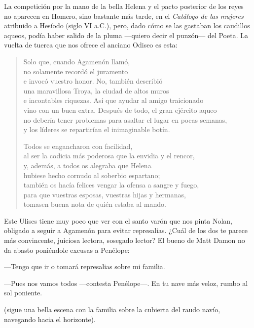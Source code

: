 \documentclass[11pt,a4paper]{article}
\begin{document}
La competición por la mano de la bella Helena y el pacto posterior de los reyes no aparecen en Homero, sino bastante más tarde, en el \emph{Catálogo de las mujeres} atribuido a Hesíodo (siglo VI a.C.), pero, dado cómo se las gastaban los caudillos aqueos, podía haber salido de la pluma ---quiero decir el punzón--- del Poeta. La vuelta de tuerca que nos ofrece el anciano Odiseo es esta:

\begin{verse}
Solo que, cuando Agamenón llamó,\\
no solamente recordó el juramento\\
e invocó vuestro honor. No, también describió\\
una maravillosa Troya, la ciudad de altos muros\\
e incontables riquezas. Así que ayudar al amigo traicionado\\
vino con un buen extra. Después de todo, el gran ejército aqueo\\
no debería tener problemas para asaltar el lugar en pocas semanas,\\
y los líderes se repartirían el inimaginable botín.

Todos se engancharon con facilidad,\\
al ser la codicia más poderosa que la envidia y el rencor,\\
y, además, a todos os alegraba que Helena\\
hubiese hecho cornudo al soberbio espartano;\\
también os hacía felices vengar la ofensa a sangre y fuego,\\
para que vuestras esposas, vuestras hijas y hermanas,\\
tomasen buena nota de quién estaba al mando.
\end{verse}

Este Ulises tiene muy poco que ver con el santo varón que nos pinta Nolan, obligado a seguir a Agamenón para evitar represalias. ¿Cuál de los dos te parece más convincente, juiciosa lectora, sosegado lector? El bueno de Matt Damon no da abasto poniéndole excusas a Penélope:

---Tengo que ir o tomará represalias sobre mi familia.

---Pues nos vamos todos ---contesta Penélope---. En tu nave más veloz, rumbo al sol poniente.

(sigue una bella escena con la familia sobre la cubierta del raudo navío, navegando hacia el horizonte).
\end{document}
